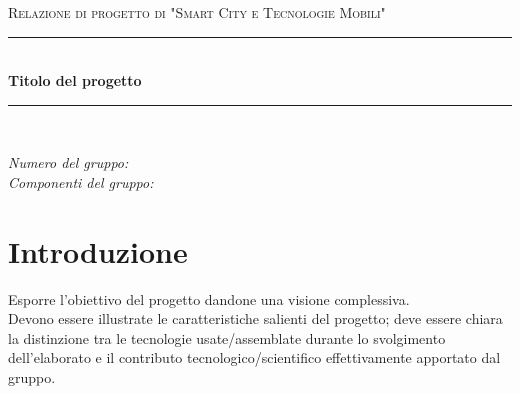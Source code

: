 \documentclass[12pt]{article}
\begin{document}

\begin{titlepage}

\newcommand{\HRule}{\rule{\linewidth}{0.5mm}}

\center

\textsc{\Large Relazione di progetto di "Smart City e Tecnologie Mobili"}\\[0.5cm]

\HRule \\[0.4cm]
{ \huge \bfseries Titolo del progetto}\\[0.4cm]
\HRule \\[1.5cm]

\vfill

\begin{flushleft}
\emph{Numero del gruppo:}\\[1cm]
\emph{Componenti del gruppo:}\\[3cm]
\end{flushleft}



\end{titlepage}


\tableofcontents

\newpage


\section{Introduzione}

Esporre l’obiettivo del progetto dandone una visione complessiva.\\

Devono essere illustrate le caratteristiche salienti del progetto; deve essere chiara la distinzione tra le tecnologie usate/assemblate durante lo svolgimento dell'elaborato e il contributo tecnologico/scientifico effettivamente apportato dal gruppo.\\
\end{document}

